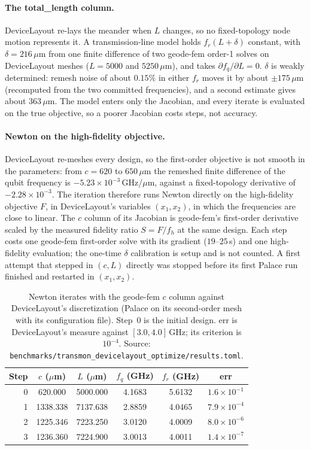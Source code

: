 \documentclass{anvil-paper}
\begin{document}
\paragraph{The total\_length column.}
DeviceLayout re-lays the meander when $L$ changes, so no fixed-topology
node motion represents it. A transmission-line model holds
$f_r(L+\delta)$ constant, with $\delta = 216\,\mu$m from one finite
difference of two geode-fem order-1 solves on DeviceLayout meshes
($L = 5000$ and $5250\,\mu$m), and takes $\partial f_q/\partial L = 0$.
$\delta$ is weakly determined:
remesh noise of about $0.15\%$ in either $f_r$ moves it by about
$\pm175\,\mu$m (recomputed from the two committed frequencies), and a
second estimate gives about $363\,\mu$m. The model enters
only the Jacobian, and every iterate is evaluated on the true objective,
so a poorer Jacobian costs steps, not accuracy.

\paragraph{Newton on the high-fidelity objective.}
DeviceLayout re-meshes every design, so the first-order objective is not
smooth in the parameters: from $c = 620$ to $650\,\mu$m the remeshed finite
difference of the qubit frequency is $-5.23\times10^{-3}$\,GHz/$\mu$m,
against a fixed-topology derivative of $-2.28\times10^{-3}$. The iteration
therefore runs Newton directly on the high-fidelity objective $F$, in
DeviceLayout's variables $(x_1, x_2)$, in which the frequencies are close
to linear. The $c$ column of its Jacobian is geode-fem's first-order
derivative scaled by the measured fidelity ratio $S = F/f_h$ at the same
design. Each step costs one geode-fem first-order solve with its
gradient ($19$--$25$\,s) and one high-fidelity evaluation; the one-time
$\delta$ calibration is setup and is not counted. A first attempt that
stepped in $(c, L)$ directly was stopped before its first Palace run
finished and restarted in $(x_1, x_2)$.

\begin{table}[htbp]
  \centering
  \caption{Newton iterates with the geode-fem $c$ column against
  DeviceLayout's discretization (Palace on its second-order mesh with its
  configuration file). Step~0 is the initial design. err is DeviceLayout's
  measure against $[3.0, 4.0]$\,GHz; its criterion is $10^{-4}$. Source:
  \texttt{benchmarks/transmon\_devicelayout\_optimize/results.toml}.}
  \label{tab:newton-dl}
  \small
  \begin{tabular}{@{}rccccc@{}}
    \toprule
    Step & $c$ ($\mu$m) & $L$ ($\mu$m) & $f_q$ (GHz) & $f_r$ (GHz) & err \\
    \midrule
    0 & 620.000 & 5000.000 & 4.1683 & 5.6132 & $1.6\times10^{-1}$ \\
    1 & 1338.338 & 7137.638 & 2.8859 & 4.0465 & $7.9\times10^{-4}$ \\
    2 & 1225.346 & 7223.250 & 3.0120 & 4.0009 & $8.0\times10^{-6}$ \\
    3 & 1236.360 & 7224.900 & 3.0013 & 4.0011 & $1.4\times10^{-7}$ \\
    \bottomrule
  \end{tabular}
\end{table}
\end{document}
